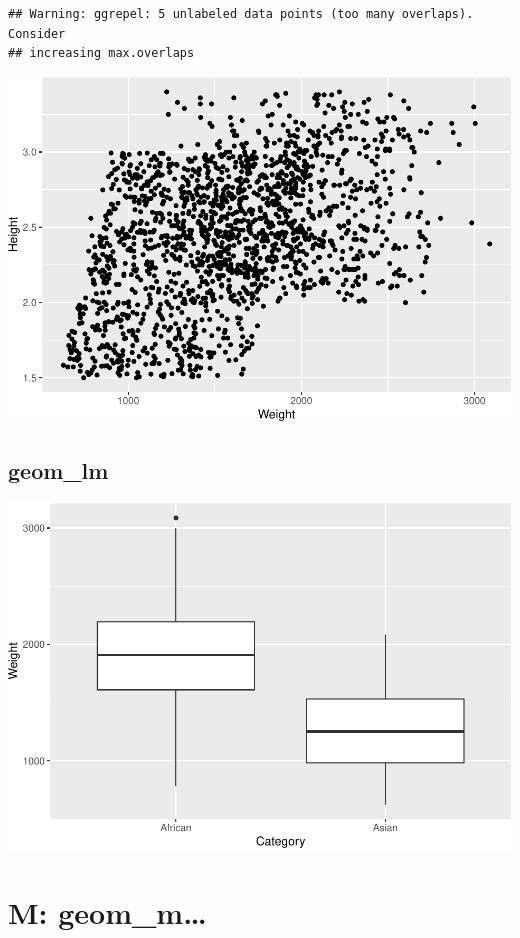 \documentclass[
]{book}
\begin{document}
\begin{verbatim}
## Warning: ggrepel: 5 unlabeled data points (too many overlaps). Consider
## increasing max.overlaps
\end{verbatim}

\includegraphics{Data-Visualisation-geom-Encyclopedia_files/figure-latex/unnamed-chunk-45-1.pdf}

\hypertarget{geom_lm}{%
\section{geom\_lm}\label{geom_lm}}

\includegraphics{Data-Visualisation-geom-Encyclopedia_files/figure-latex/unnamed-chunk-46-1.pdf}

\hypertarget{m-geom_m}{%
\chapter{M: geom\_m\ldots{}}\label{m-geom_m}}
\end{document}
